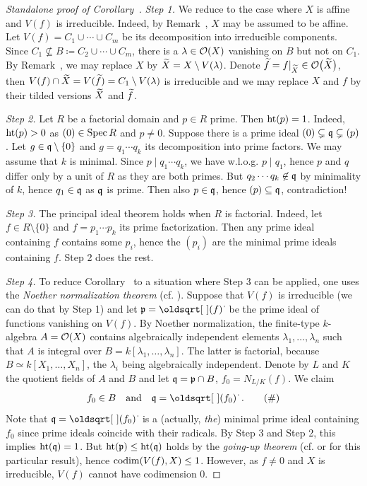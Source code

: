 \documentclass[a4paper,parskip=half,numbers=enddot, DIV=12]{scrreprt}
\begin{document}
\begin{proof}[Standalone proof of Corollary~]
	\emph{Step 1.} We reduce to the case where $X$ is affine and $V(f)$ is irreducible. Indeed, by Remark~, $X$ may be assumed to be affine. Let $V(f)=C_1\cup\cdots\cup C_m$ be its decomposition into irreducible components. Since $C_1\not\subseteq B\coloneqq C_2\cup\cdots\cup C_m$, there is a $\lambda\in\mathcal{O}(X)$ vanishing on $B$ but not on $C_1$. By Remark~, we may replace $X$ by $\snake X=X\setminus V(\lambda)$. Denote $\snake f=f|_{\snake X}\in\Oo\big(\snake X\big)$, then $V(f)\cap \snake X=V(\snake f)=C_1\setminus V(\lambda)$ is irreducible and we may replace $X$ and $f$ by their tilded versions $\snake X$ and $\snake f$.
	
	\emph{Step 2.} Let $R$ be a factorial domain and $p\in R$ prime. Then $\operatorname{ht}(p)=1$. Indeed, $\operatorname{ht}(p)>0$ as $(0)\in\operatorname{Spec} R$ and $p\not=0$. Suppose there is a prime ideal $(0)\subsetneq\mathfrak{q}\subsetneq(p)$. Let $g\in\mathfrak{q}\setminus\{0\}$ and $g=q_1\cdots q_k$ its decomposition into prime factors. We may assume that $k$ is minimal. Since $p\mid q_1\cdots q_k$, we have w.l.o.g. $p\mid q_1$, hence $p$ and $q$ differ only by a unit of $R$ as they are both primes. But $q_2\cdots q_k\not\in\mathfrak{q}$ by minimality of $k$, hence $q_1\in\mathfrak{q}$ as $\mathfrak{q}$ is prime. Then also $p\in\mathfrak{q}$, hence $(p)\subseteq\mathfrak{q}$, contradiction!
	
	\emph{Step 3.} The principal ideal theorem holds when $R$ is factorial. Indeed, let $f\in R\setminus\{0\}$ and $f=p_1\cdots p_k$ its prime factorization. Then any prime ideal containing $f$ contains some $p_i$, hence the $(p_i)$ are the minimal prime ideals containing $f$. Step 2 does the rest.
	
	\emph{Step 4.} To reduce Corollary~ to a situation where Step 3 can be applied, one uses the \emph{Noether normalization theorem} (cf. \cite[Theorem~3]{alg1}). Suppose that $V(f)$ is irreducible (we can do that by Step 1) and let $\pp=\sqrt{(f)}$ be the prime ideal of functions vanishing on $V(f)$. By Noether normalization, the finite-type $k$-algebra $A=\mathcal{O}(X)$ contains algebraically independent elements $\lambda_1,\ldots,\lambda_n$ such that $A$ is integral over $B=k[\lambda_1,\ldots,\lambda_n]$. The latter is factorial, because $B\simeq k[X_1,\ldots,X_n]$, the $\lambda_i$ being algebraically independent. Denote by $L$ and $K$ the quotient fields of $A$ and $B$ and let $\mathfrak{q}=\mathfrak{p}\cap B$, $f_0=N_{L/K}(f)$. We claim
	\begin{align}\lbl{eq:GoingUp2Bapplied}
		f_0\in B\quad\text{and}\quad \qq=\sqrt{(f_0)}\;.\tag{\#}
	\end{align}
	Note that $\qq=\sqrt{(f_0)}$ is a (actually, \emph{the}) minimal prime ideal containing $f_0$ since prime ideals coincide with their radicals. By Step 3 and Step 2, this implies $\operatorname{ht}(\mathfrak{q})=1$. But $\operatorname{ht}(\mathfrak{p})\leq\operatorname{ht}(\mathfrak{q})$ holds by the \emph{going-up theorem} (cf. \cite[Theorem~7]{alg1} or \cite[Fact~2.6.2]{alg1} for this particular result), hence $\operatorname{codim}(V(f), X)\leq 1$. However, as $f\not=0$ and $X$ is irreducible, $V(f)$ cannot have codimension 0. 
	

\end{proof}
\end{document}
